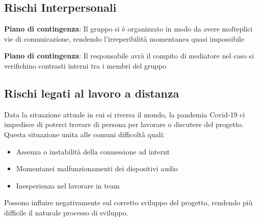 	\subsection{Rischi Interpersonali}
		\def\productquality{
			{
        			Irreperibilita
				momentanea
				RI1,
        			Potrebbero verificarsi momenti in cui uno o più membri del team siano irreperibili, 
        			è responsabilità di ogni membro del gruppo comunicare eventuali imprevisti e organizzarsi in modo da non ostacolare il calendario delle consegne,
        			Occorrenza: Bassa 
				Pericolosità: Media
    			},
		}
		
		\textbf{Piano di contingenza}: Il gruppo si è organizzato in modo da avere molteplici vie di comunicazione, rendendo l'irreperibilità momentanea quasi impossibile
		\pagebreak
		\def\productquality{
			{
        			Contrasti 
				interni
				RI2,
        			Potrebbero verificarsi divergenze tra i membri del gruppo, 
        			Ciascun dei membri del team si impegna ad agire al fine di non ostacolare il naturale svolgimento del progetto e discutere di eventuali problemi solo in seduta di riunione,
        			Occorrenza: Bassa 
				Pericolosità: Media,
        			Il responsabile avrà il compito di fare da mediatore in caso ci fossero contrasti tra i membri del gruppo
    			},
		}
		
		\textbf{Piano di contingenza}: Il responsabile avrà il compito di mediatore nel caso si verifichino contrasti interni tra i membri del gruppo
	\subsection{Rischi legati al lavoro a distanza}
		Data la situazione attuale in cui si riversa il mondo, la pandemia Covid-19 ci impedisce di poterci trovare di persona per lavorare o discutere del progetto. Questa situazione unita alle comuni difficoltà quali:
		\begin{itemize}
			\item Assenza o instabilità della connessione ad internt
			\item Momentanei malfunzionamenti dei dispositivi audio
			\item Inesperienza nel lavorare in team 
		\end{itemize}
		Possono influire negativamente sul corretto sviluppo del progetto, rendendo più difficile il naturale processo di sviluppo.